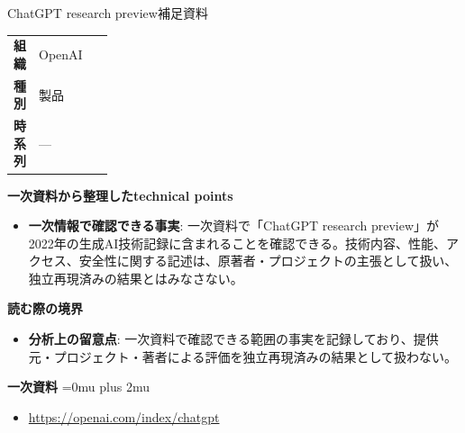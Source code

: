 \begin{technicalnote}{ChatGPT research preview}{補足資料}
\begingroup
\begin{tabularx}{\linewidth}{@{}>{\bfseries}p{0.22\linewidth}X@{}}
組織 & OpenAI \\
種別 & 製品 \\
時系列 & — \\
\end{tabularx}
\smallskip
{\bfseries 一次資料から整理したtechnical points}
\begin{itemize}[leftmargin=1.5em,itemsep=0.35em]
\item \textbf{一次情報で確認できる事実}: 一次資料で「ChatGPT research preview」が2022年の生成AI技術記録に含まれることを確認できる。技術内容、性能、アクセス、安全性に関する記述は、原著者・プロジェクトの主張として扱い、独立再現済みの結果とはみなさない。
\end{itemize}
\begin{minipage}{\linewidth}
{\bfseries 読む際の境界}
\begin{itemize}[leftmargin=1.5em,itemsep=0.35em]
\item \textbf{分析上の留意点}: 一次資料で確認できる範囲の事実を記録しており、提供元・プロジェクト・著者による評価を独立再現済みの結果として扱わない。
\end{itemize}
\begin{samepage}
{\bfseries 一次資料}
\begingroup\sloppy
\Urlmuskip=0mu plus 2mu\relax
\begin{itemize}[leftmargin=1.5em,itemsep=0.25em]
\item {\scriptsize\url{https://openai.com/index/chatgpt}}
\end{itemize}
\endgroup
\end{samepage}
\end{minipage}
\endgroup
\end{technicalnote}
\medskip

